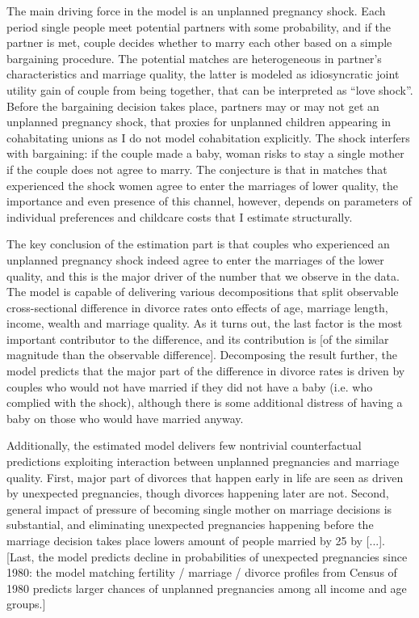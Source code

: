 \documentclass[12pt,letter]{article}
\begin{document}
The main driving force in the model is an unplanned pregnancy shock. Each period single people meet potential partners with some probability, and if the partner is met, couple decides whether to marry each other based on a simple bargaining procedure. The potential matches are heterogeneous in partner's characteristics and marriage quality, the latter is modeled as idiosyncratic joint utility gain of couple from being together, that can be interpreted as ``love shock''.  Before the bargaining decision takes place, partners may or may not get an unplanned pregnancy shock, that proxies for unplanned children appearing in cohabitating unions as I do not model cohabitation explicitly. The shock interfers with bargaining: if the couple made a baby, woman risks to stay a single mother if the couple does not agree to marry. The conjecture is that in matches that experienced the shock women agree to enter the marriages of lower quality, the importance and even presence of this channel, however, depends on parameters of individual preferences and childcare costs that I estimate structurally.

The key conclusion of the estimation part is that couples who experienced an unplanned pregnancy shock indeed agree to enter the marriages of the lower quality, and this is the major driver of the number that we observe in the data. The model is capable of delivering various decompositions that split observable cross-sectional difference in divorce rates onto effects of age, marriage length, income, wealth and marriage quality. As it turns out, the last factor is the most important contributor to the difference, and its contribution is [of the similar magnitude than the observable difference]. Decomposing the result further, the model predicts that the major part of the difference in divorce rates is driven by couples who would not have married if they did not have a baby (i.e. who complied with the shock), although there is some additional distress of having a baby on those who would have married anyway.

Additionally, the estimated model delivers few nontrivial counterfactual predictions exploiting interaction between unplanned pregnancies and marriage quality. First, major part of divorces that happen early in life are seen as driven by unexpected pregnancies, though divorces happening later are not. Second, general impact of pressure of becoming single mother on marriage decisions is substantial, and eliminating unexpected pregnancies happening before the marriage decision takes place lowers amount of people married by 25 by [...]. [Last, the model predicts decline in probabilities of unexpected pregnancies since 1980: the model matching fertility / marriage / divorce profiles from Census of 1980 predicts larger chances of unplanned pregnancies among all income and age groups.]
\end{document}
